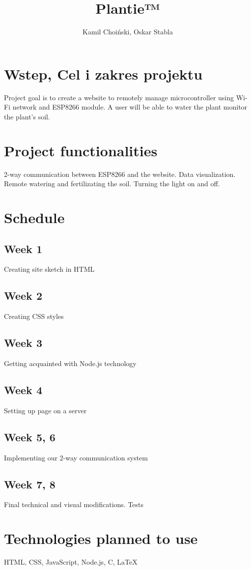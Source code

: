 \documentclass{article}
\begin{document}
\title{Plantie™}
\author{Kamil Choiński, Oskar Stabla}
\maketitle


\tableofcontents

\section{Wstep, Cel i zakres projektu}
Project goal is to create a website to remotely manage microcontroller using Wi-Fi network and ESP8266 module. A user will be able to water the plant monitor the plant's soil.
\section{Project functionalities}
2-way communication between ESP8266 and the website. Data visualization. Remote watering and fertilizating the soil. Turning the light on and off.
\section{Schedule}
\subsection{Week 1}
Creating site sketch in HTML
\subsection{Week 2}
Creating CSS styles
\subsection{Week 3}
Getting acquainted with Node.js technology
\subsection{Week 4}
Setting up page on a server 
\subsection{Week 5, 6}
Implementing our 2-way communication system
\subsection{Week 7, 8}
Final technical and visual modifications. Tests

\section{Technologies planned to use}
HTML, CSS, JavaScript, Node.js, C, LaTeX
\end{document}
